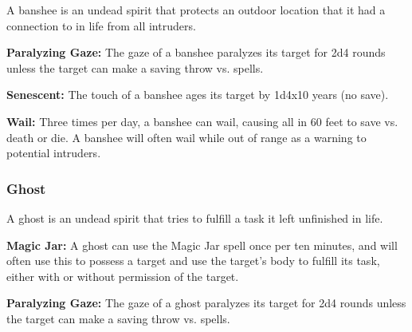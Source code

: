 \begin{multicols*}{2}
A banshee is an undead spirit that protects an outdoor location that it had a connection to in life from all intruders.

\textbf{Paralyzing Gaze:} The gaze of a banshee paralyzes its target for 2d4 rounds unless the target can make a saving throw vs. spells.

\textbf{Senescent:} The touch of a banshee ages its target by 1d4x10 years (no save).

\textbf{Wail:} Three times per day, a banshee can wail, causing all in 60 feet to save vs. death or die. A banshee will often wail while out of range as a warning to potential intruders.

\subsubsection{Ghost}

A ghost is an undead spirit that tries to fulfill a task it left unfinished in life.

\textbf{Magic Jar:} A ghost can use the Magic Jar spell once per ten minutes, and will often use this to possess a target and use the target’s body to fulfill its task, either with or without permission of the target.

\textbf{Paralyzing Gaze:} The gaze of a ghost paralyzes its target for 2d4 rounds unless the target can make a saving throw vs. spells.


\end{multicols*}
